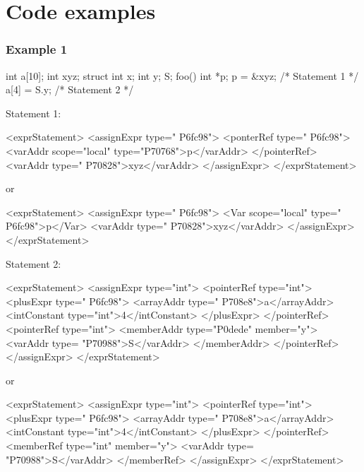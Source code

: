 \section{Code examples}


\subsubsection*{Example 1}

\begin{CExample}
  int a[10];
  int xyz;
  struct {    int x;   int y;} S;
  foo() {
  	int *p; 
  	p =  &xyz;	/* Statement 1 */
  	a[4] = S.y;	/* Statement 2 */
  }
\end{CExample}

Statement 1:
\vspace{2mm}

\begin{XcodeMLExample}
  <exprStatement>
    <assignExpr type=" P6fc98">
     <ponterRef type=" P6fc98">
        <varAddr scope="local" type="P70768">p</varAddr>
       </pointerRef>
      <varAddr type=" P70828">xyz</varAddr>
    </assignExpr>
  </exprStatement>
\end{XcodeMLExample}
 
or
\vspace{2mm}

\begin{XcodeMLExample}
  <exprStatement>
    <assignExpr type=" P6fc98">
    <Var scope="local" type=" P6fc98">p</Var>
       <varAddr type=" P70828">xyz</varAddr>
   </assignExpr>
  </exprStatement>
\end{XcodeMLExample}

Statement 2:
\vspace{2mm}

\begin{XcodeMLExample}
  <exprStatement>
   <assignExpr type="int">
      <pointerRef type="int">
        <plusExpr type=" P6fc98">
          <arrayAddr type=" P708e8">a</arrayAddr>
          <intConstant type="int">4</intConstant>
        </plusExpr>
     </pointerRef>
     <pointerRef type="int">
        <memberAddr type="P0dede" member="y">
           <varAddr type= "P70988">S</varAddr>
        </memberAddr>
    </pointerRef>
   </assignExpr>
  </exprStatement>
\end{XcodeMLExample}

or
\vspace{2mm}

\begin{XcodeMLExample}
  <exprStatement>
   <assignExpr type="int">
      <pointerRef type="int">
        <plusExpr type=" P6fc98">
          <arrayAddr type=" P708e8">a</arrayAddr>
          <intConstant type="int">4</intConstant>
        </plusExpr>
     </pointerRef>
     <memberRef type="int" member="y">
        <varAddr type= "P70988">S</varAddr>
    </memberRef>
   </assignExpr>
  </exprStatement>
\end{XcodeMLExample}

